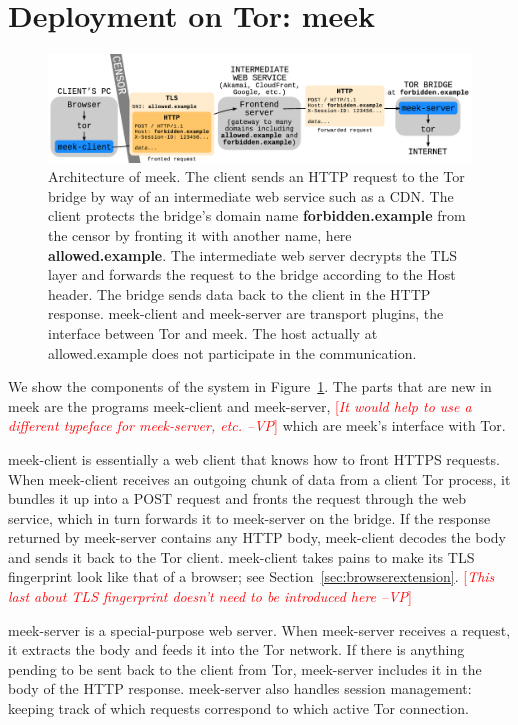 \documentclass{sig-alternate}
\newcommand{\meekclient}{\mbox{meek-client}\xspace}
\newcommand{\meekserver}{\mbox{meek-server}\xspace}
\newcommand{\meek}{meek\xspace}
\newcommand{\note}[1]{{\textcolor{red}{[\textit{#1}]}}}
\newcommand{\vp}[1]{\note{#1 --VP}}
\begin{document}
\section{Deployment on Tor: meek}
\label{sec:deploy-tor}

\begin{figure}
\centering
\includegraphics[width=\linewidth]{meek-architecture}
\caption{
Architecture of \meek.
The client sends an HTTP request to the Tor bridge by way of an intermediate web service such as a CDN.
The client protects the bridge's domain name \textbf{forbidden.example} from the censor
by fronting it with another name, here \textbf{allowed.example}.
The intermediate web server decrypts the TLS layer and forwards the request to the bridge
according to the Host header.
The bridge sends data back to the client in the HTTP response.
\meekclient and \meekserver are transport plugins, the interface between Tor and \meek.
The host actually at allowed.example does not participate in the communication.
}
\label{fig:meek-architecture}
\end{figure}

We show the components of the system in Figure~\ref{fig:meek-architecture}.
The parts that are new in \meek
are the programs \meekclient and \meekserver,
\vp{It would help to use a different typeface for \meekserver, etc.}
which are \meek's interface with Tor.

\meekclient is essentially a web client that knows how to front HTTPS requests.
When \meekclient receives an outgoing chunk of data from a client Tor process, it bundles it up into a POST request
and fronts the request through the web service,
which in turn forwards it to \meekserver on the bridge.
If the response returned by \meekserver contains any HTTP body,
\meekclient decodes the body and sends it back to the Tor client.
\meekclient takes pains to make its TLS fingerprint
look like that of a browser; see Section~\ref{sec:browserextension}.
\vp{This last about TLS fingerprint doesn't need to be introduced here}

\meekserver is a special-purpose web server.
When \meekserver receives a request, it extracts the body and feeds it into
the Tor network.
If there is anything pending to be sent back to the client from Tor,
\meekserver includes it in the body of the HTTP response.
\meekserver also handles session management:
keeping track of which requests correspond to which active Tor connection.
\end{document}
